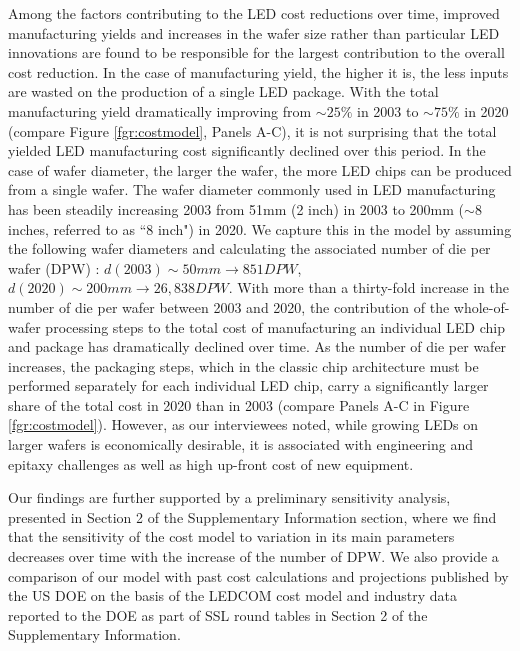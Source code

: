 \documentclass[parskip=full]{article}
\begin{document}
Among the factors contributing to the LED cost reductions over time, improved manufacturing yields and increases in the wafer size rather than particular LED innovations are found to be responsible for the largest contribution to the overall cost reduction. In the case of manufacturing yield, the higher it is, the less inputs are wasted on the production of a single LED package. With the total manufacturing yield dramatically improving from $\sim25\%$ in 2003 to $\sim75\%$ in 2020 (compare Figure \ref{fgr:costmodel}, Panels A-C), it is not surprising that the total yielded LED manufacturing cost significantly declined over this period. In the case of wafer diameter, the larger the wafer, the more LED chips can be produced from a single wafer. The wafer diameter commonly used in LED manufacturing has been steadily increasing 2003 from 51mm (2 inch) in 2003 to 200mm ($\sim$8 inches, referred to as “8 inch") in 2020. We capture this in the model by assuming the following wafer diameters and calculating the associated number of die per wafer (DPW) \cite{de2005investigation}: $d(2003)\sim 50 mm \rightarrow851 DPW$, $d(2020)\sim200 mm \rightarrow 26,838 DPW$. With more than a thirty-fold increase in the number of die per wafer between 2003 and 2020, the contribution of the whole-of-wafer processing steps to the total cost of manufacturing an individual LED chip and package has dramatically declined over time. As the number of die per wafer increases, the packaging steps, which in the classic chip architecture must be performed separately for each individual LED chip, carry a significantly larger share of the total cost in 2020 than in 2003 (compare Panels A-C in Figure \ref{fgr:costmodel}). However, as our interviewees noted, while growing LEDs on larger wafers is economically desirable, it is associated with engineering and epitaxy challenges as well as high up-front cost of new equipment.

Our findings are further supported by a preliminary sensitivity analysis, presented in Section 2 of the Supplementary Information section, where we find that the sensitivity of the cost model to variation in its main parameters decreases over time with the increase of the number of DPW. We also provide a comparison of our model with past cost calculations and projections published by the US DOE on the basis of the LEDCOM cost model \cite{ledcomv2} and industry data reported to the DOE as part of SSL round tables in Section 2 of the Supplementary Information.
\end{document}
